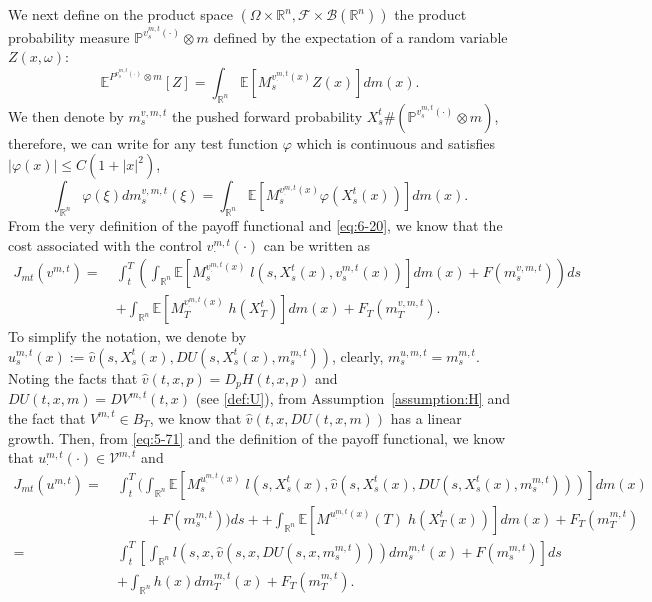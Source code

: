 \documentclass[11pt]{article}
\numberwithin{equation}{section}
\newcommand{\e}{\mathbb{E}}
\newcommand{\brn}{{\mathbb{R}^n}}
\newcommand{\1}{\mbox{1\hspace{-1mm}I}}
\begin{document}
We next define on the product space $\left(\Omega\times \brn,\mathcal{F}\times\mathcal{B}(\brn)\right)$ the product probability measure $\mathbb{P}^{v^{m,t}_s(\cdot)}\otimes m$ defined by the expectation of a random variable $Z(x,\omega)$:
\begin{equation*}\label{eq:6-19}
    \e^{P^{v^{m,t}_s(\cdot)}\otimes m}[Z]=\int_{\brn}\e \left[M^{v^{m,t}_\cdot(x)}_s Z(x)\right]dm(x).
\end{equation*}
We then denote by $m^{v,m,t}_s$ the pushed forward probability $X^{t}_s\#\left(\mathbb{P}^{v^{m,t}_s(\cdot)}\otimes m\right)$, therefore, we can write for any test function $\varphi$ which is continuous and satisfies $|\varphi(x)|\le C\left(1+|x|^{2}\right)$,
\begin{equation}\label{eq:6-20}
    \int_{\brn}\varphi(\xi)dm^{v,m,t}_s(\xi)=\int_{\brn}\e \left[M^{v^{m,t}_\cdot(x)}_s\varphi\left(X^{t}_s(x)\right)\right]dm(x).
\end{equation}
From the very definition of the payoff functional and \eqref{eq:6-20}, we know that the cost associated with the control $v^{m,t}_\cdot(\cdot)$ can be written as
\begin{equation}\label{eq:6-21}
\begin{aligned}
    J_{mt}\left(v^{m,t}\right)=\ & \int_{t}^{T}\left(\int_{\brn}\e \left[M^{v^{m,t}_\cdot(x)}_s \;l\left(s,X^{t}_s(x),v^{m,t}_s(x)\right)\right]dm(x)+F\left(m^{v,m,t}_s\right)\right)ds\\
    &+\int_{\brn}\e\left[M^{v^{m,t}_\cdot(x)}_T \;h\left(X^{t}_T\right)\right]dm(x)+F_{T}\left(m^{v,m,t}_T\right).
\end{aligned}
\end{equation}
To simplify the notation, we denote by $u^{m,t}_s(x):=\widehat{v}\left(s,X^{t}_s(x),DU\left(s,X^{t}_s(x),m^{m,t}_s\right)\right)$, clearly, $m^{u,m,t}_s=m^{m,t}_s$. Noting the facts that $\widehat{v}(t,x,p)=D_p H(t,x,p)$ and $DU(t,x,m)=DV^{m,t}(t,x)$ (see \eqref{def:U}), from Assumption~\ref{assumption:H} and the fact that $V^{m,t}\in B_T$, we know that $\widehat{v}(t,x,DU(t,x,m))$ has a linear growth. Then, from \eqref{eq:5-71} and the definition of the payoff functional, we know that $u^{m,t}_\cdot(\cdot)\in\mathcal{V}^{m,t}$ and 
\begin{align*}
    J_{mt}\left(u^{m,t}\right)=\ &  \int_{t}^{T}\bigg(\int_{\brn}\e \left[M^{u^{m,t}_\cdot(x)}_s\;l\left(s,X^{t}_s(x),\widehat{v}\left(s,X^{t}_s(x),DU\left(s,X^{t}_s(x),m^{m,t}_s\right)\right)\right)\right]dm(x)\\
    &\qquad +F\left(m^{m,t}_s\right)\bigg)ds + +\int_{\brn}\e\left[M^{u^{m,t}_\cdot(x)}(T)\;h\left(X^{t}_T(x)\right)\right]dm(x)+F_{T}\left(m^{m,t}_T\right)\\
    =\ & \int_{t}^{T}\left[\int_{\brn}l\left(s,x,\widehat{v}\left(s,x,DU\left(s,x,m^{m,t}_s\right)\right)\right)dm^{m,t}_s(x)+F\left(m^{m,t}_s\right)\right]ds \\
    &+ \int_{\brn}h(x)dm^{m,t}_T(x)+F_{T}\left(m^{m,t}_T\right).
\end{align*}
\end{document}
